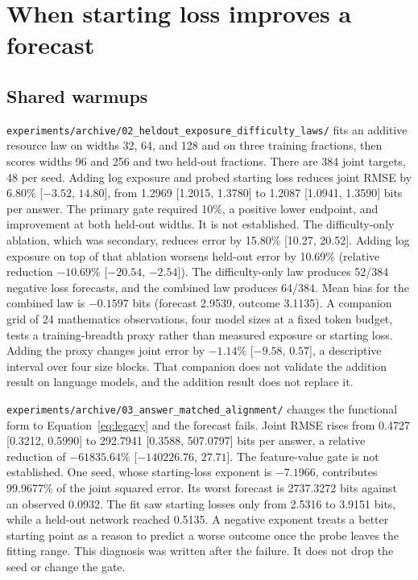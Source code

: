 \section{When starting loss improves a forecast}
\label{sec:forecasts}

\subsection{Shared warmups}
\texttt{experiments/archive/02\_heldout\_exposure\_difficulty\_laws/} fits an additive resource law on widths 32, 64, and 128 and on three training fractions, then scores widths 96 and 256 and two held-out fractions.
There are 384 joint targets, 48 per seed.
Adding log exposure and probed starting loss reduces joint RMSE by 6.80\% [$-3.52$, $14.80$], from 1.2969 [1.2015, 1.3780] to 1.2087 [1.0941, 1.3590] bits per answer.
The primary gate required 10\%, a positive lower endpoint, and improvement at both held-out widths.
It is not established.
The difficulty-only ablation, which was secondary, reduces error by 15.80\% [10.27, 20.52].
Adding log exposure on top of that ablation worsens held-out error by 10.69\% (relative reduction $-10.69\%$ [$-20.54$, $-2.54$]).
The difficulty-only law produces 52/384 negative loss forecasts, and the combined law produces 64/384.
Mean bias for the combined law is $-0.1597$ bits (forecast 2.9539, outcome 3.1135).
A companion grid of 24 mathematics observations, four model sizes at a fixed token budget, tests a training-breadth proxy rather than measured exposure or starting loss.
Adding the proxy changes joint error by $-1.14\%$ [$-9.58$, $0.57$], a descriptive interval over four size blocks.
That companion does not validate the addition result on language models, and the addition result does not replace it.

\texttt{experiments/archive/03\_answer\_matched\_alignment/} changes the functional form to Equation~\eqref{eq:legacy} and the forecast fails.
Joint RMSE rises from 0.4727 [0.3212, 0.5990] to 292.7941 [0.3588, 507.0797] bits per answer, a relative reduction of $-61835.64\%$ [$-140226.76$, $27.71$].
The feature-value gate is not established.
One seed, whose starting-loss exponent is $-7.1966$, contributes 99.9677\% of the joint squared error.
Its worst forecast is 2737.3272 bits against an observed 0.0932.
The fit saw starting losses only from 2.5316 to 3.9151 bits, while a held-out network reached 0.5135.
A negative exponent treats a better starting point as a reason to predict a worse outcome once the probe leaves the fitting range.
This diagnosis was written after the failure.
It does not drop the seed or change the gate.

